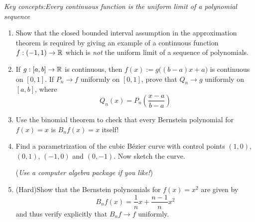 \begin{exercises}
	\emph{Key concepts:\quad Every continuous function is the uniform limit of a polynomial sequence}


	\begin{enumerate}
	  \item Show that the closed bounded interval assumption in the approximation theorem is required by giving an example of a continuous function $f:(-1,1)\to\mathbb{R}$ which is \emph{not} the uniform limit of a sequence of polynomials.
	  
	  
	  \item If $g:[a,b]\to\mathbb{R}$ is continuous, then $f(x):=g\bigl((b-a)x+a\bigr)$ is continuous on $[0,1]$. If $P_n\to f$ uniformly on $[0,1]$, prove that $Q_n\to g$ uniformly on $[a,b]$, where
		\[
			Q_n(x)= P_n\left(\frac{x-a}{b-a}\right)
		\]
	
	
		\item Use the binomial theorem to check that every Bernstein polynomial for $f(x)=x$ is $B_nf(x)=x$ itself!
	  
	  
		\item Find a parametrization of the cubic Bézier curve with control points $(1,0)$, $(0,1)$, $(-1,0)$ and $(0,-1)$. Now sketch the curve.\par
		(\emph{Use a computer algebra package if you like!})
		
		
		\item (Hard)\lstsp Show that the Bernstein polynomials for $f(x)=x^2$ are given by 
		\[
			B_nf(x)=\frac 1nx+\frac{n-1}nx^2
		\]
		and thus verify explicitly that $B_nf\to f$ uniformly.
	\end{enumerate}
\end{exercises}

